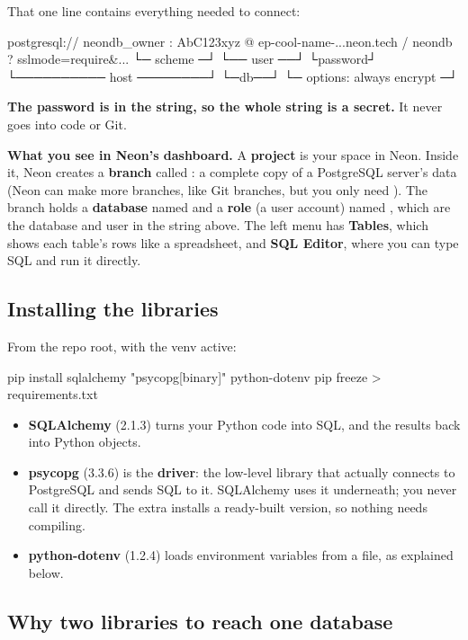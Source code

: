 That one line contains everything needed to connect:

\begin{code}
postgresql://  neondb_owner : AbC123xyz @ ep-cool-name-...neon.tech / neondb ? sslmode=require&...
└─ scheme ─┘   └── user ──┘  └password┘  └────────── host ────────┘ └─db──┘ └─ options: always encrypt ─┘
\end{code}

\textbf{The password is in the string, so the whole string is a secret.} It never goes into code or Git.

\textbf{What you see in Neon's dashboard.} A \textbf{project} is your space in Neon. Inside it, Neon creates a \textbf{branch} called : a complete copy of a PostgreSQL server's data (Neon can make more branches, like Git branches, but you only need ). The branch holds a \textbf{database} named  and a \textbf{role} (a user account) named , which are the database and user in the string above. The left menu has \textbf{Tables}, which shows each table's rows like a spreadsheet, and \textbf{SQL Editor}, where you can type SQL and run it directly.

\subsection{Installing the libraries}

From the repo root, with the venv active:

\begin{code}
pip install sqlalchemy "psycopg[binary]" python-dotenv
pip freeze > requirements.txt
\end{code}

\begin{itemize}
\item \textbf{SQLAlchemy} (2.1.3) turns your Python code into SQL, and the results back into Python objects.
\item \textbf{psycopg} (3.3.6) is the \textbf{driver}: the low-level library that actually connects to PostgreSQL and sends SQL to it. SQLAlchemy uses it underneath; you never call it directly. The \cd{[binary]} extra installs a ready-built version, so nothing needs compiling.
\item \textbf{python-dotenv} (1.2.4) loads environment variables from a file, as explained below.
\end{itemize}

\subsection{Why two libraries to reach one database}

